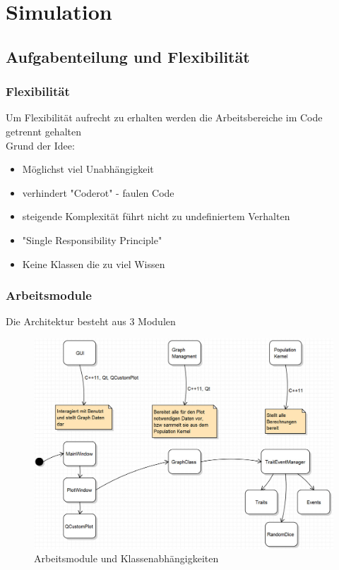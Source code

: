 \documentclass{beamer}
\begin{document}
\section{Simulation}
	\subsection{Aufgabenteilung und Flexibilität}
		\begin{frame}
			\frametitle{Flexibilität}
			Um Flexibilität aufrecht zu erhalten werden die Arbeitsbereiche im Code getrennt gehalten\\
			\pause
			Grund der Idee:
			\begin{itemize}
				\item Möglichst viel Unabhängigkeit
				\pause
				\item verhindert "Coderot" - faulen Code
				\pause
				\item steigende Komplexität führt nicht zu undefiniertem Verhalten
				\pause
				\item "{}Single Responsibility Principle"{}
				\pause
				\item Keine Klassen die zu viel Wissen
			\end{itemize}
		\end{frame}
		\begin{frame}
			\frametitle{Arbeitsmodule}
			Die Architektur besteht aus 3 Modulen
			\pause
			\begin{figure}[H]
				\centering
				\includegraphics[width=0.8\linewidth]{./Bild_Module}
				\caption[Module]{Arbeitsmodule und Klassenabhängigkeiten}
				\label{Module und Klassen}
			\end{figure}
		\end{frame}
\end{document}
